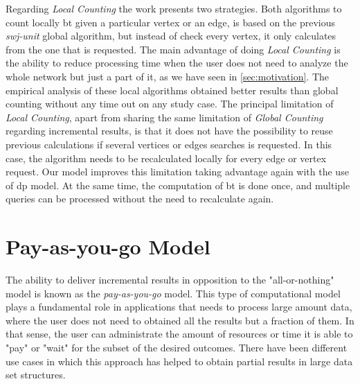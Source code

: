 Regarding \emph{Local Counting} the work presents two strategies. 
Both algorithms to count locally \acrshort{bt} given a particular vertex or an edge, is based on the previous \emph{swj-unit} global algorithm, but instead of check every vertex, it only calculates from the one that is requested. 
The main advantage of doing \emph{Local Counting} is the ability to reduce processing time when the user does not need to analyze the whole network but just a part of it, as we have seen in \autoref{sec:motivation}.
The empirical analysis of these local algorithms obtained better results than global counting without any time out on any study case.
The principal limitation of \emph{Local Counting}, apart from sharing the same limitation of \emph{Global Counting} regarding incremental results, is that it does not have the possibility to reuse previous calculations if several vertices or edges searches is requested. 
In this case, the algorithm needs to be recalculated locally for every edge or vertex request.
Our model improves this limitation taking advantage again with the use of \acrshort{dp} model. At the same time, the computation of \acrshort{bt} is done once, and multiple queries can be processed without the need to recalculate again.

\section{Pay-as-you-go Model}
The ability to deliver incremental results in opposition to the "all-or-nothing" model is known as the \emph{pay-as-you-go} model. 
This type of computational model plays a fundamental role in applications that needs to process large amount data, where the user does not need to obtained all the results but a fraction of them.
In that sense, the user can administrate the amount of resources or time it is able to "pay" or "wait" for the subset of the desired outcomes. 
There have been different use cases in which this approach has helped to obtain partial results in large data set structures.

